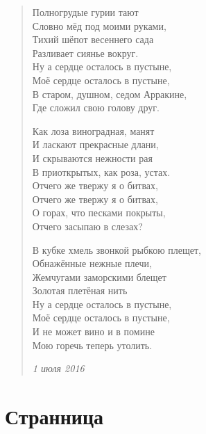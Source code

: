 \documentclass[a4paper,12pt]{article}
\newcommand{\ldotst}{\so{...}\xspace}
\begin{document}
\begin{verse}
Полногрудые гурии тают\\
Словно мёд под моими руками,\\
Тихий шёпот весеннего сада\\
Разливает сиянье вокруг.\\
Ну а сердце осталось в пустыне,\\
Моё сердце осталось в пустыне,\\
В старом, душном, седом Арракине,\\
Где сложил свою голову друг.

Как лоза виноградная, манят\\
И ласкают прекрасные длани,\\
И скрываются нежности рая\\
В приоткрытых, как роза, устах.\\
Отчего же твержу я о битвах,\\
Отчего же твержу я о битвах,\\
О горах, что песками покрыты,\\
Отчего засыпаю в слезах?

В кубке хмель звонкой рыбкою плещет,\\
Обнажённые нежные плечи,\\
Жемчугами заморскими блещет\\
Золотая плетёная нить\ldotst\\
Ну а сердце осталось в пустыне,\\
Моё сердце осталось в пустыне,\\
И не может вино и в помине\\
Мою горечь теперь утолить.

\emph{1 июля 2016}
\end{verse}
\newpage

\section{Странница}
\end{document}
